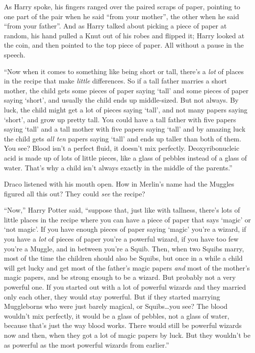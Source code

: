 As Harry spoke, his fingers ranged over the paired scraps of paper, pointing to
one part of the pair when he said “from your mother”, the other when he said
“from your father”. And as Harry talked about picking a piece of paper at
random, his hand pulled a Knut out of his robes and flipped it; Harry looked at
the coin, and then pointed to the top piece of paper. All without a pause in
the speech.

“Now when it comes to something like being short or tall, there’s a \emph{lot}
of places in the recipe that make \emph{little} differences. So if a tall
father marries a short mother, the child gets some pieces of paper saying
‘tall’ and some pieces of paper saying ‘short’, and usually the child ends up
middle-sized. But not always. By luck, the child might get a lot of pieces
saying ‘tall’, and not many papers saying ‘short’, and grow up pretty tall. You
could have a tall father with five papers saying ‘tall’ and a tall mother with
five papers saying ‘tall’ and by amazing luck the child gets \emph{all ten}
papers saying ‘tall’ and ends up taller than both of them. You see? Blood isn’t
a perfect fluid, it doesn’t mix perfectly. Deoxyribonucleic acid is made up of
lots of little pieces, like a glass of pebbles instead of a glass of water.
That’s why a child isn’t always exactly in the middle of the parents.”

Draco listened with his mouth open. How in Merlin’s name had the Muggles
figured all this out? They could \emph{see} the recipe?

“Now,” Harry Potter said, “suppose that, just like with tallness, there’s lots
of little places in the recipe where you can have a piece of paper that says
‘magic’ or ‘not magic’. If you have enough pieces of paper saying ‘magic’
you’re a wizard, if you have a \emph{lot} of pieces of paper you’re a powerful
wizard, if you have too few you’re a Muggle, and in between you’re a Squib.
Then, when two Squibs marry, most of the time the children should also be
Squibs, but once in a while a child will get lucky and get most of the father’s
magic papers \emph{and} most of the mother’s magic papers, and be strong enough
to be a wizard. But probably not a very powerful one. If you started out with a
lot of powerful wizards and they married only each other, they would stay
powerful. But if they started marrying Muggleborns who were just barely
magical, or Squibs…you see? The blood wouldn’t mix perfectly, it would
be a glass of pebbles, not a glass of water, because that’s just the way blood
works. There would still be powerful wizards now and then, when they got a lot
of magic papers by luck. But they wouldn’t be as powerful as the most powerful
wizards from earlier.”


